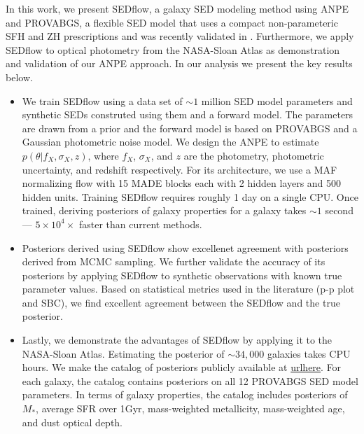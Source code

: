 In this work, we present {\sc SEDflow}, a galaxy SED modeling method using ANPE
and PROVABGS, a flexible SED model that uses a compact non-parameteric SFH and
ZH prescriptions and was recently validated in \cite{hahn2022}.
Furthermore, we apply {\sc SEDflow} to optical photometry from the NASA-Sloan
Atlas as demonstration and validation of our ANPE approach.  
In our analysis we present the key results below.
\begin{itemize}
    \item We train {\sc SEDflow} using a data set of ${\sim}1$ million SED
        model parameters  and synthetic SEDs construted using them and a
        forward model.
        The parameters are drawn from a prior and the forward model is based on
        PROVABGS and a Gaussian photometric noise model. 
        We design the ANPE to estimate $p(\theta | f_X, \sigma_X, z)$, where
        $f_X$, $\sigma_X$, and $z$ are the photometry, photometric uncertainty,
        and redshift respectively. 
        For its architecture, we use a MAF normalizing flow with 15 MADE blocks
        each with 2 hidden layers and 500 hidden units.
        Training {\sc SEDflow} requires roughly 1 day on a single CPU. 
        Once trained, deriving posteriors of galaxy properties for a galaxy
        takes ${\sim}1$ second --- $5\times10^4\times$ faster than current 
        methods.
    \item Posteriors derived using {\sc SEDflow} show excellenet agreement with
        posteriors derived from MCMC sampling. 
        We further validate the accuracy of its posteriors by applying  {\sc
        SEDflow} to synthetic observations with known true parameter values.  
        Based on statistical metrics used in the literature (p-p plot and SBC),
        we find excellent agreement between the {\sc SEDflow} and the true
        posterior. 
    \item Lastly, we demonstrate the advantages of {\sc SEDflow} by applying it
        to the NASA-Sloan Atlas.
        Estimating the posterior of ${\sim}34,000$ galaxies takes  
        CPU hours. 
        We make the catalog of posteriors publicly available at \url{urlhere}. 
        For each galaxy, the catalog contains posteriors on all 12 PROVABGS
        SED model parameters.
        In terms of galaxy properties, the catalog includes posteriors of
        $M_*$, average SFR over 1Gyr, mass-weighted metallicity, mass-weighted
        age, and dust optical depth. 
\end{itemize}

